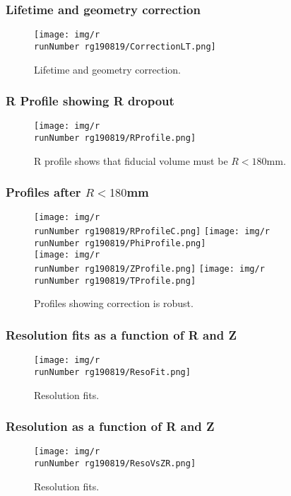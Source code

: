 \begin{frame}
\frametitle{Lifetime and geometry correction}
\begin{figure}
  \begin{center}
      \texttt{[image: img/r\\runNumber rg190819/CorrectionLT.png]}
    \caption{Lifetime and geometry correction.}
  \end{center}
\end{figure}
\end{frame}

\begin{frame}
\frametitle{R Profile showing R dropout}
\begin{figure}
  \begin{center}
      \texttt{[image: img/r\\runNumber rg190819/RProfile.png]}
    \caption{R profile shows that fiducial volume must be $R < 180$mm.}
  \end{center}
\end{figure}
\end{frame}


\begin{frame}
\frametitle{Profiles after $R < 180$mm}
\begin{figure}
  \begin{center}
      \texttt{[image: img/r\\runNumber rg190819/RProfileC.png]}
      \texttt{[image: img/r\\runNumber rg190819/PhiProfile.png]} \\
      \texttt{[image: img/r\\runNumber rg190819/ZProfile.png]}
      \texttt{[image: img/r\\runNumber rg190819/TProfile.png]}
    \caption{Profiles showing correction is robust.}
  \end{center}
\end{figure}
\end{frame}

\begin{frame}
\frametitle{Resolution fits as a function of R and Z}
\begin{figure}
  \begin{center}
      \texttt{[image: img/r\\runNumber rg190819/ResoFit.png]}
    \caption{Resolution fits.}
  \end{center}
\end{figure}
\end{frame}

\begin{frame}
\frametitle{Resolution as a function of R and Z}
\begin{figure}
  \begin{center}
      \texttt{[image: img/r\\runNumber rg190819/ResoVsZR.png]}
    \caption{Resolution fits.}
  \end{center}
\end{figure}
\end{frame}

